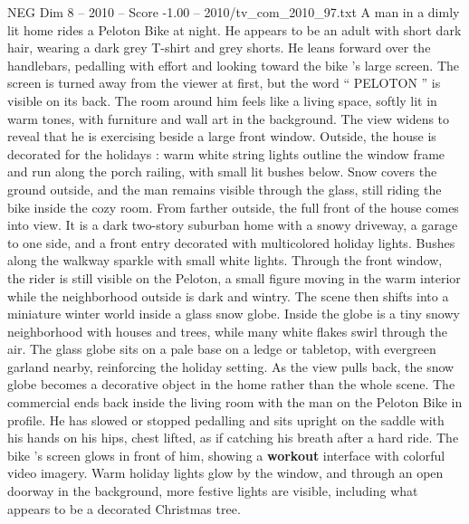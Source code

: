 \begin{textsample}{NEG Dim 8 – 2010 – Score -1.00 – 2010/tv\_com\_2010\_97.txt}  \label{ex:f8_neg_080}
A man in a dimly lit home rides a Peloton Bike at night.
He appears to be an adult with short dark hair, wearing a dark grey T-shirt and grey shorts.
He leans forward over the handlebars, pedalling with effort and looking toward the bike ’s large screen.
The screen is turned away from the viewer at first, but the word “ PELOTON ” is visible on its back.
The room around him feels like a living space, softly lit in warm tones, with furniture and wall art in the background.
The view widens to reveal that he is exercising beside a large front window.
Outside, the house is decorated for the holidays : warm white string lights outline the window frame and run along the porch railing, with small lit bushes below.
Snow covers the ground outside, and the man remains visible through the glass, still riding the bike inside the cozy room.
From farther outside, the full front of the house comes into view.
It is a dark two-story suburban home with a snowy driveway, a garage to one side, and a front entry decorated with multicolored holiday lights.
Bushes along the walkway sparkle with small white lights.
Through the front window, the rider is still visible on the Peloton, a small figure moving in the warm interior while the neighborhood outside is dark and wintry.
The scene then shifts into a miniature winter world inside a glass snow globe.
Inside the globe is a tiny snowy neighborhood with houses and trees, while many white flakes swirl through the air.
The glass globe sits on a pale base on a ledge or tabletop, with evergreen garland nearby, reinforcing the holiday setting.
As the view pulls back, the snow globe becomes a decorative object in the home rather than the whole scene.
The commercial ends back inside the living room with the man on the Peloton Bike in profile.
He has slowed or stopped pedalling and sits upright on the saddle with his hands on his hips, chest lifted, as if catching his breath after a hard ride.
The bike ’s screen glows in front of him, showing a \textbf{workout} interface with colorful video imagery.
Warm holiday lights glow by the window, and through an open doorway in the background, more festive lights are visible, including what appears to be a decorated Christmas tree.

\end{textsample}
